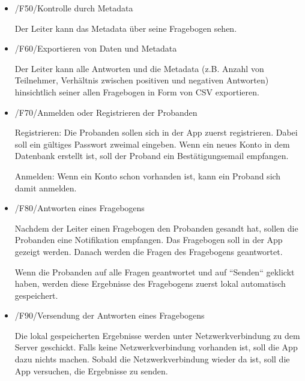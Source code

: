 \documentclass[a4paper]{scrreprt}
\begin{document}
        \begin{itemize}
            \item /F50/Kontrolle durch Metadata
            	\par Der Leiter kann das Metadata über seine Fragebogen sehen.

        \end{itemize}
        \begin{itemize}
            \item /F60/Exportieren von Daten und Metadata
            	\par Der Leiter kann alle Antworten und die Metadata (z.B. Anzahl von Teilnehmer, Verhältnis zwischen positiven und negativen Antworten) hinsichtlich seiner allen Fragebogen in Form von CSV exportieren.

        \end{itemize}
        \begin{itemize}
            \item /F70/Anmelden oder Registrieren der Probanden

            	\par Registrieren: Die Probanden sollen sich in der App zuerst registrieren. Dabei soll ein gültiges Passwort zweimal eingeben. Wenn ein neues Konto in dem Datenbank erstellt ist, soll der Proband ein Bestätigungsemail empfangen.
                \par Anmelden: Wenn ein Konto schon vorhanden ist, kann ein Proband sich damit anmelden.



        \end{itemize}
        \begin{itemize}
            \item /F80/Antworten eines Fragebogens

            	\par Nachdem der Leiter einen Fragebogen den Probanden gesandt hat, sollen die Probanden eine Notifikation empfangen. Das Fragebogen soll in der App gezeigt werden. Danach werden die Fragen des Fragebogens geantwortet.
                \par
Wenn die Probanden auf alle Fragen geantwortet und auf “Senden“ geklickt haben, werden diese Ergebnisse des Fragebogens zuerst lokal automatisch gespeichert. 


        \end{itemize}
        \begin{itemize}
            \item /F90/Versendung der Antworten eines Fragebogens

            	\par Die lokal gespeicherten Ergebnisse werden unter Netzwerkverbindung zu dem Server geschickt. Falls keine Netzwerkverbindung vorhanden ist, soll die App dazu nichts machen. Sobald die Netzwerkverbindung wieder da ist, soll die App versuchen, die Ergebnisse zu senden.


        \end{itemize}
 
\end{document}
